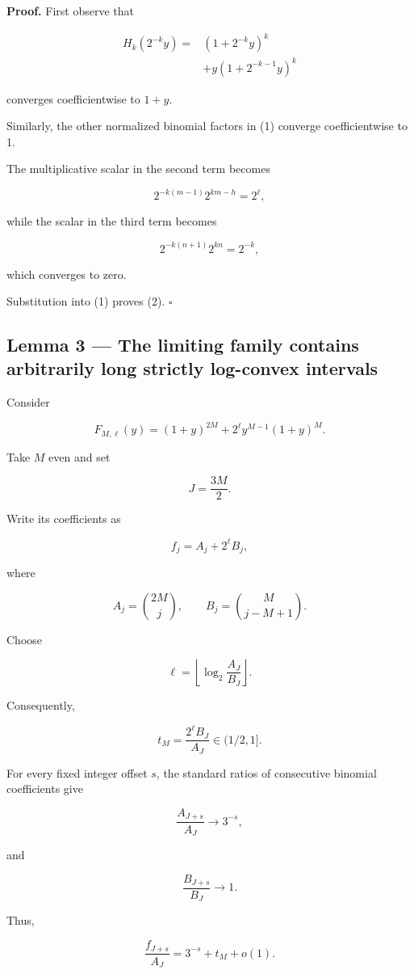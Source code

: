 \documentclass[11pt]{article}
\begin{document}
\textbf{Proof.} First observe that

\[
\begin{aligned}
H_k(2^{-k}y)
={}&(1+2^{-k}y)^k\\
&+y(1+2^{-k-1}y)^k
\end{aligned}
\]

converges coefficientwise to \(1+y\).

Similarly, the other normalized binomial factors in (1) converge coefficientwise to 1.

The multiplicative scalar in the second term becomes

\[
2^{-k(m-1)}2^{km-h}
=2^\ell,
\]

while the scalar in the third term becomes

\[
2^{-k(n+1)}2^{kn}=2^{-k},
\]

which converges to zero.

Substitution into (1) proves (2). \(\square\)

\subsection{Lemma 3 --- The limiting family contains arbitrarily long strictly log-convex intervals}

Consider

\[
F_{M,\ell}(y)
=(1+y)^{2M}+2^\ell y^{M-1}(1+y)^M.
\]

Take \(M\) even and set

\[
J=\frac{3M}{2}.
\]

Write its coefficients as

\[
f_j=A_j+2^\ell B_j,
\]

where

\[
A_j=\binom{2M}{j},
\qquad
B_j=\binom{M}{j-M+1}.
\]

Choose

\[
\ell=
\left\lfloor
\log_2\frac{A_J}{B_J}
\right\rfloor.
\]

Consequently,

\[
t_M=\frac{2^\ell B_J}{A_J}
\in(1/2,1].
\tag{3}
\]

For every fixed integer offset \(s\), the standard ratios of consecutive binomial coefficients give

\[
\frac{A_{J+s}}{A_J}\longrightarrow 3^{-s},
\]

and

\[
\frac{B_{J+s}}{B_J}\longrightarrow 1.
\]

Thus,

\[
\frac{f_{J+s}}{A_J}
=3^{-s}+t_M+o(1).
\tag{4}
\]
\end{document}
